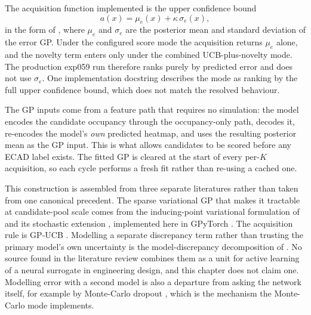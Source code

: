 The acquisition function implemented is the upper confidence bound
\begin{equation}
a(x) = \mu_e(x) + \kappa \, \sigma_e(x),
\label{eq:gp_ucb}
\end{equation}
in the form of \cite{srinivas2010gp}, where $\mu_e$ and $\sigma_e$ are the posterior mean and
standard deviation of the error GP. Under the configured score mode the acquisition returns $\mu_e$
alone, and the novelty term enters only under the combined UCB-plus-novelty mode. The production
exp059 run therefore ranks purely by predicted error and does not use $\sigma_e$. One implementation
docstring describes the mode as ranking by the full upper confidence bound, which does not match the
resolved behaviour.

The GP inputs come from a feature path that requires no simulation: the model encodes the candidate
occupancy through the occupancy-only path, decodes it, re-encodes the model's \emph{own} predicted
heatmap, and uses the resulting posterior mean as the GP input. This is what allows candidates to be
scored before any ECAD label exists. The fitted GP is cleared at the start of every per-$K$
acquisition, so each cycle performs a fresh fit rather than re-using a cached one.

This construction is assembled from three separate literatures rather than taken from one canonical
precedent. The sparse variational GP that makes it tractable at candidate-pool scale comes from the
inducing-point variational formulation of \cite{titsias2009variational} and its stochastic extension
\cite{hensman2013bigdata}, implemented here in GPyTorch \cite{gardner2018gpytorch}. The acquisition
rule is GP-UCB \cite{srinivas2010gp}. Modelling a separate discrepancy term rather than trusting the
primary model's own uncertainty is the model-discrepancy decomposition of
\cite{kennedy2001calibration}. No source found in the literature review combines them as a unit for
active learning of a neural surrogate in engineering design, and this chapter does not claim one.
Modelling error with a second model is also a departure from asking the network itself, for example
by Monte-Carlo dropout \cite{gal2016dropout}, which is the mechanism the Monte-Carlo mode implements.

